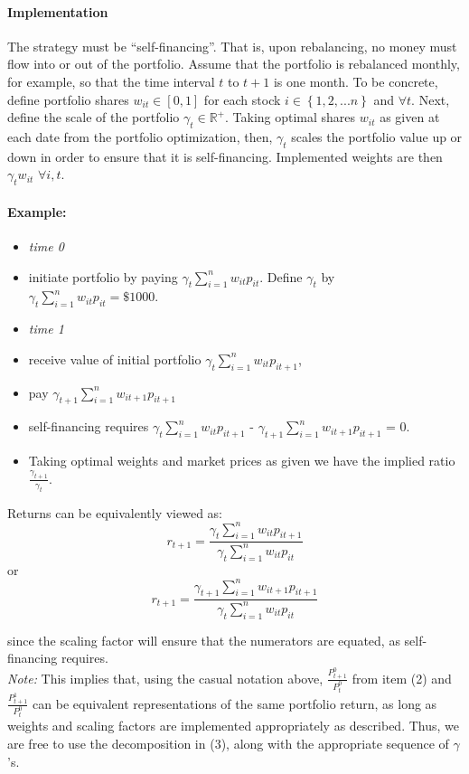 \documentclass[12pt]{article}
\begin{document}
\paragraph{Implementation} The strategy must be ``self-financing''.  That is, upon rebalancing, no money must flow into or out of the portfolio.  Assume that the portfolio is rebalanced monthly, for example, so that the time interval $t$ to $t+1$ is one month.  To be concrete, define portfolio shares $w_{it} \in \left[0,1\right]$ for each stock $i \in \left\{1, 2, ... n \right\}$ and $\forall t$.  Next, define the scale of the portfolio $\gamma_t \in \mathbb{R}^+$.  Taking optimal shares $w_{it}$ as given at each date from the portfolio optimization, then, $\gamma_t$ scales the portfolio value up or down in order to ensure that it is self-financing.  Implemented weights are then $\gamma_t w_{it} \,\, \forall i,t$. 

\paragraph{Example:}
\begin{itemize} 
\item \textit{time 0} 
\item []initiate portfolio by paying $\gamma_t \sum_{i=1}^n w_{it} p_{it}$.  Define $\gamma_t$ by  $\gamma_t \sum_{i=1}^n w_{it} p_{it}=\$1000$.
\item \textit{time 1} 
\item[] receive value of initial portfolio $\gamma_t \sum_{i=1}^n w_{it} p_{it+1}$, 
\item[] pay $\gamma_{t+1} \sum_{i=1}^n w_{it+1} p_{it+1}$
\item[] self-financing requires $\gamma_t \sum_{i=1}^n w_{it} p_{it+1}$ - $\gamma_{t+1} \sum_{i=1}^n w_{it+1} p_{it+1}$ = 0.  
\item [] Taking optimal weights and market prices as given we have the implied ratio $\frac{\gamma_{t+1}}{\gamma_t}$.
\end{itemize}
Returns can be equivalently viewed as:
\[r_{t+1}=\frac{\gamma_t \sum_{i=1}^n w_{it} p_{it+1} }{\gamma_t \sum_{i=1}^n w_{it} p_{it}} \]
or
\[r_{t+1}=\frac{\gamma_{t+1} \sum_{i=1}^n w_{it+1} p_{it+1} }{\gamma_t \sum_{i=1}^n w_{it} p_{it}} \]

since the scaling factor will ensure that the numerators are equated, as self-financing requires.\\

\noindent\textit{Note:} This implies that, using the casual notation above, 
$\frac{P^0_{t+1}}{P^0_{t}}$ from item (2) and $\frac{P^1_{t+1}}{P^0_{t}}$ can be equivalent representations of the same portfolio return, as long as weights and scaling factors are implemented appropriately as described.  Thus, we are free to use the decomposition in (3), along with the appropriate sequence of $\gamma$'s.
\end{document}
